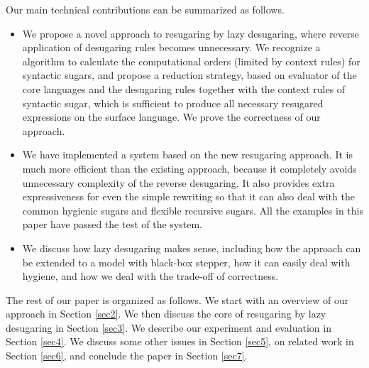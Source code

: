Our main technical contributions can be summarized as follows.
\begin{itemize}
\item We propose a novel approach to resugaring by lazy desugaring, where reverse application of desugaring rules becomes unnecessary. We recognize a algorithm to calculate the computational orders (limited by context rules) for syntactic sugars, and propose a reduction strategy, based on evaluator of the core languages and the desugaring rules together with the context rules of syntactic sugar, which is sufficient to produce all necessary resugared expressions on the surface language. We prove the correctness of our approach.

\item We have implemented a system based on the new resugaring approach. It is much more efficient than the existing approach, because it completely avoids unnecessary complexity of the reverse desugaring. It also provides extra expressiveness for even the simple rewriting so that it can also deal with the common hygienic sugars and flexible recursive sugars. All the examples in this paper have passed the test of the system. 

\item We discuss how lazy desugaring makes sense, including how the approach can be extended to a model with black-box stepper, how it can easily deal with hygiene, and how we deal with the trade-off of correctness.


\end{itemize}

The rest of our paper is organized as follows. We start with an overview of our approach in Section \ref{sec2}. We then discuss the core of resugaring by lazy desugaring in Section \ref{sec3}. We describe our experiment and evaluation in Section \ref{sec4}. We discuss  some other issues in Section \ref{sec5}, on related work in Section \ref{sec6}, and conclude the paper in Section \ref{sec7}.
